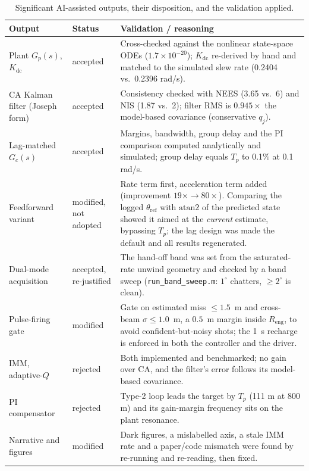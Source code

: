 \documentclass[conference]{IEEEtran}
\begin{document}
\begin{table}[h]
\centering\footnotesize
\caption{Significant AI-assisted outputs, their disposition, and the validation applied.}
\label{tab:ai}
\begin{tabular}{@{}>{\raggedright\arraybackslash}p{3.6cm}>{\raggedright\arraybackslash}p{3.0cm}>{\raggedright\arraybackslash}p{10.4cm}@{}}
\toprule
Output & Status & Validation / reasoning\\
\midrule
Plant $G_p(s)$, $K_{\mathrm{dc}}$ & accepted & Cross-checked against the nonlinear state-space ODEs ($1.7\times10^{-20}$); $K_{\mathrm{dc}}$ re-derived by hand and matched to the simulated slew rate (0.2404 vs.\ 0.2396 rad/s).\\
CA Kalman filter (Joseph form) & accepted & Consistency checked with NEES (3.65 vs.\ 6) and NIS (1.87 vs.\ 2); filter RMS is $0.945\times$ the model-based covariance (conservative $q_j$).\\
Lag-matched $G_c(s)$ & accepted & Margins, bandwidth, group delay and the PI comparison computed analytically and simulated; group delay equals $T_p$ to 0.1\% at 0.1 rad/s.\\
Feedforward variant & modified, not adopted & Rate term first, acceleration term added (improvement $19\times\to80\times$). Comparing the logged $\theta_{\mathrm{ref}}$ with $\mathrm{atan2}$ of the predicted state showed it aimed at the \emph{current} estimate, bypassing $T_p$; the lag design was made the default and all results regenerated.\\
Dual-mode acquisition & accepted, re-justified & The hand-off band was set from the saturated-rate unwind geometry and checked by a band sweep (\texttt{run\_band\_sweep.m}: $1^\circ$ chatters, $\ge2^\circ$ is clean).\\
Pulse-firing gate & modified & Gate on estimated miss $\le1.5$~m and cross-beam $\sigma\le1.0$~m, a $0.5$~m margin inside $R_{\mathrm{eng}}$, to avoid confident-but-noisy shots; the 1~s recharge is enforced in both the controller and the driver.\\
IMM, adaptive-$Q$ & rejected & Both implemented and benchmarked; no gain over CA, and the filter's error follows its model-based covariance.\\
PI compensator & rejected & Type-2 loop leads the target by $T_p$ (111 m at 800 m) and its gain-margin frequency sits on the plant resonance.\\
Narrative and figures & modified & Dark figures, a mislabelled axis, a stale IMM rate and a paper/code mismatch were found by re-running and re-reading, then fixed.\\
\bottomrule
\end{tabular}
\end{table}
\end{document}
